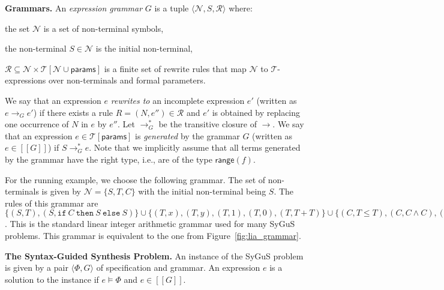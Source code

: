 \documentclass{llncs}
\newcommand\tuple[1]{\langle #1 \rangle}
\newcommand\Expr{e}
\newcommand\Spec{\Phi}
\newcommand\Grammar{G}
\newcommand\sem[1]{[\![ #1 ]\!]}
\newcommand\SynthFun{f}
\newcommand\range{\mathsf{range}}
\newcommand\FormalParameters{\mathsf{params}}
\newcommand\NonTerminals{\mathcal{N}}
\newcommand\NonTerminal{N}
\newcommand\StartSymbol{S}
\newcommand\Rules{\mathcal{R}}
\newcommand\Rule{R}
\newcommand\Theory{\mathcal{T}}
\newcommand\RewritesTo{\rightarrow}
\newcommand\ITE[3]{\mathtt{if}~#1~\mathtt{then}~#2~\mathtt{else}~#3}
\newcommand{\sygus}{{\sffamily\fontsize{8.5}{10}\selectfont
    SyGuS}\xspace}
\renewcommand{\paragraph}[1]{\par\noindent\textbf{#1.}}
\begin{document}
\paragraph{Grammars}
An {\em expression grammar} $\Grammar$ is a tuple $\tuple {
\NonTerminals, \StartSymbol, \Rules }$ where:
\begin{inparaenum}[(a)]
\item the set $\NonTerminals$ is a set of non-terminal symbols,
\item the non-terminal $\StartSymbol \in \NonTerminals$ is the initial non-terminal,
\item $\Rules \subseteq \NonTerminals \times
  \Theory[\NonTerminals \cup \FormalParameters]$ is a finite set
  of rewrite rules that map $\NonTerminals$ to $\Theory$-expressions
  over non-terminals and formal parameters.
\end{inparaenum}
We say that an expression $\Expr$ {\em rewrites to} an incomplete
expression $\Expr'$ (written as $\Expr \RewritesTo_\Grammar \Expr'$) if
there exists a rule $\Rule = (\NonTerminal, \Expr'') \in \Rules$ and
$\Expr'$ is obtained by replacing one occurrence of $\NonTerminal$ in
$\Expr$ by $\Expr''$.
Let $\RewritesTo_\Grammar^*$ be the transitive closure of $\RewritesTo$.
We say that an expression $\Expr \in \Theory[\FormalParameters]$
is {\em generated} by the grammar $\Grammar$ (written as $\Expr \in
\sem{\Grammar}$) if $\StartSymbol \RewritesTo_\Grammar^* \Expr$.
Note that we implicitly assume that all terms generated by the grammar
have the right type, i.e., are of the type $\range(\SynthFun)$.

\begin{example}
  \label{ex:running:grammar}
  For the running example, we choose the following grammar.
  The set of non-terminals is given by $\NonTerminals = \{ \StartSymbol, T, C \}$ with
  the initial non-terminal being $\StartSymbol$.
  The rules of this grammar are $\{ (\StartSymbol, T), (\StartSymbol,
      \ITE{C}{\StartSymbol}{\StartSymbol})
    \} \cup \{ (T, x), (T, y), (T, 1), (T, 0), (T, T + T) \} \cup
        \{ (C, T \leq T), (C, C \wedge C), (C, \neg C) \}$.
  This is the standard linear integer arithmetic grammar used for many
  \sygus problems.
  This grammar is equivalent to the one from
  Figure~\ref{fig:lia_grammar}.
\end{example}

\paragraph{The Syntax-Guided Synthesis Problem}
An instance of the \sygus problem is given by a pair $\tuple { \Spec,
\Grammar }$ of specification and grammar.
An expression $\Expr$ is a solution to the instance if $\Expr \models
\Spec$ and $\Expr \in \sem{\Grammar}$.
\end{document}
